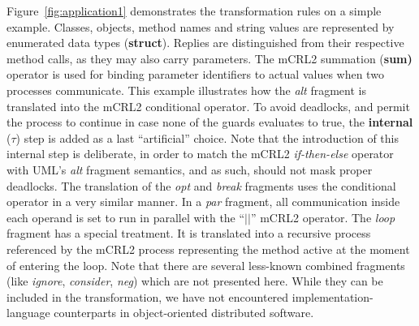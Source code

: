 \documentclass[letter]{llncs}
\begin{document}
Figure~\ref{fig:application1} demonstrates the transformation rules on a simple example. 
Classes, objects, method names and string values
are represented by enumerated data types (\textbf{struct}). 
Replies are distinguished from their respective method calls, as they may also carry
parameters. The mCRL2 summation (\textbf{sum)} operator is used for binding parameter identifiers to actual values when two processes communicate. 
This example illustrates how the \emph{alt} fragment is translated into the mCRL2 conditional operator. To avoid deadlocks, and permit the process
to continue in case none of the guards evaluates to true, the \textbf{internal} (${\tau}$) step is added as a last ``artificial'' choice. 
Note that the introduction of this internal step is deliberate, in order to match the mCRL2 \emph{if-then-else} operator with 
UML's \emph{alt} fragment semantics, and as such, should not mask proper deadlocks.
The translation
of the \textit{opt} and \textit{break} fragments uses the conditional operator in a very similar manner. In a \textit{par} fragment,
all communication inside each operand is set to run in parallel with the  ``${||}$'' mCRL2 operator.
The \textit{loop} fragment has a special treatment. It is translated into a recursive process referenced by the mCRL2 process representing
the method active at the moment of entering the loop.
Note that there are several less-known combined fragments (like \emph{ignore}, \emph{consider}, \emph{neg}) which are not presented here. 
While they can be included in the transformation, we have not encountered implementation-language counterparts in
object-oriented distributed software.
\end{document}
